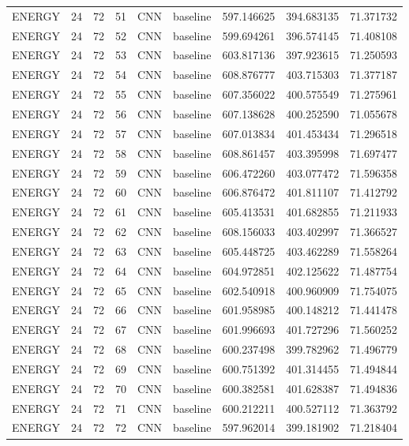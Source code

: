 \begin{table}
\begin{tabular}{lrrrllrrr}
ENERGY & 24 & 72 & 51 & CNN & baseline & 597.146625 & 394.683135 & 71.371732 \\
ENERGY & 24 & 72 & 52 & CNN & baseline & 599.694261 & 396.574145 & 71.408108 \\
ENERGY & 24 & 72 & 53 & CNN & baseline & 603.817136 & 397.923615 & 71.250593 \\
ENERGY & 24 & 72 & 54 & CNN & baseline & 608.876777 & 403.715303 & 71.377187 \\
ENERGY & 24 & 72 & 55 & CNN & baseline & 607.356022 & 400.575549 & 71.275961 \\
ENERGY & 24 & 72 & 56 & CNN & baseline & 607.138628 & 400.252590 & 71.055678 \\
ENERGY & 24 & 72 & 57 & CNN & baseline & 607.013834 & 401.453434 & 71.296518 \\
ENERGY & 24 & 72 & 58 & CNN & baseline & 608.861457 & 403.395998 & 71.697477 \\
ENERGY & 24 & 72 & 59 & CNN & baseline & 606.472260 & 403.077472 & 71.596358 \\
ENERGY & 24 & 72 & 60 & CNN & baseline & 606.876472 & 401.811107 & 71.412792 \\
ENERGY & 24 & 72 & 61 & CNN & baseline & 605.413531 & 401.682855 & 71.211933 \\
ENERGY & 24 & 72 & 62 & CNN & baseline & 608.156033 & 403.402997 & 71.366527 \\
ENERGY & 24 & 72 & 63 & CNN & baseline & 605.448725 & 403.462289 & 71.558264 \\
ENERGY & 24 & 72 & 64 & CNN & baseline & 604.972851 & 402.125622 & 71.487754 \\
ENERGY & 24 & 72 & 65 & CNN & baseline & 602.540918 & 400.960909 & 71.754075 \\
ENERGY & 24 & 72 & 66 & CNN & baseline & 601.958985 & 400.148212 & 71.441478 \\
ENERGY & 24 & 72 & 67 & CNN & baseline & 601.996693 & 401.727296 & 71.560252 \\
ENERGY & 24 & 72 & 68 & CNN & baseline & 600.237498 & 399.782962 & 71.496779 \\
ENERGY & 24 & 72 & 69 & CNN & baseline & 600.751392 & 401.314455 & 71.494844 \\
ENERGY & 24 & 72 & 70 & CNN & baseline & 600.382581 & 401.628387 & 71.494836 \\
ENERGY & 24 & 72 & 71 & CNN & baseline & 600.212211 & 400.527112 & 71.363792 \\
ENERGY & 24 & 72 & 72 & CNN & baseline & 597.962014 & 399.181902 & 71.218404 \\

\end{tabular}
\end{table}
